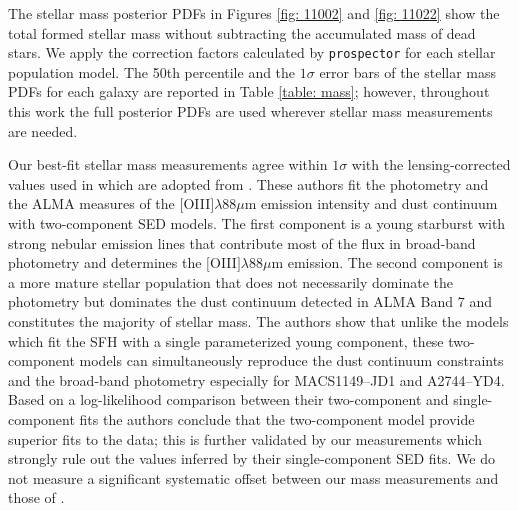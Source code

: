 \documentclass[twocolumn]{aastex631}
\begin{document}
The stellar mass posterior PDFs in Figures \ref{fig: 11002} and \ref{fig: 11022} show the total formed stellar mass without subtracting the accumulated mass of dead stars. We apply the correction factors calculated by \texttt{prospector} for each stellar population model. The 50th percentile and the $1\sigma$ error bars of the stellar mass PDFs for each galaxy are reported in Table \ref{table: mass}; however, throughout this work the full posterior PDFs are used wherever stellar mass measurements are needed. 

Our best-fit stellar mass measurements agree within $1\sigma$ with the lensing-corrected values used in \cite{jones+2020} which are adopted from \cite{rb2020}. These authors fit the photometry and the ALMA measures of the $[$O{\footnotesize\;III}$]\lambda88\mu$m emission intensity and dust continuum with two-component SED models. The first component is a young starburst with strong nebular emission lines that contribute most of the flux in broad-band photometry and determines the $[$O{\footnotesize\;III}$]\lambda88\mu$m emission. The second component is a more mature stellar population that does not necessarily dominate the photometry but dominates the dust continuum detected in ALMA Band 7 and constitutes the majority of stellar mass. The authors show that unlike the models which fit the SFH with a single parameterized young component, these two-component models can simultaneously reproduce the dust continuum constraints and the broad-band photometry especially for MACS1149--JD1 and A2744--YD4. Based on a log-likelihood comparison between their two-component and single-component fits the authors conclude that the two-component model provide superior fits to the data; this is further validated by our measurements which strongly rule out the values inferred by their single-component SED fits. We do not measure a significant systematic offset between our mass measurements and those of \cite{rb2020} \citep[$< 0.1$ dex if the B14--65666 galaxy, which has 1 dex errorbars in][is excluded]{rb2020}.
\end{document}
